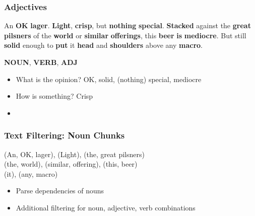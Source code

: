 \begin{frame}
    \frametitle{\textcolor{isegreen}{Adjectives}}
    \label{review_adjectives}
\begin{spacing}{1.6}
    An \textbf{\textcolor{isegreen}{OK}} \textbf{\textcolor{isered}{lager}}. \textbf{\textcolor{isered}{Light}}, \textbf{\textcolor{isegreen}{crisp}}, but \textbf{\textcolor{isered}{nothing}} \textbf{\textcolor{isegreen}{special}}. \textbf{\textcolor{iseblue}{Stacked}} against the \textbf{\textcolor{isegreen}{great}} \textbf{\textcolor{isered}{pilsners}} of the \textbf{\textcolor{isered}{world}} or \textbf{\textcolor{isegreen}{similar}} \textbf{\textcolor{isered}{offerings}}, this \textbf{\textcolor{isered}{beer}} \textbf{\textcolor{iseblue}{is}} \textbf{\textcolor{isegreen}{mediocre}}. But still \textbf{\textcolor{isegreen}{solid}} enough to \textbf{\textcolor{iseblue}{put}} it \textbf{\textcolor{isered}{head}} and \textbf{\textcolor{isered}{shoulders}} above any \textbf{\textcolor{isered}{macro}}.
\end{spacing}

\vspace{-10pt}
\begin{flushright}
    \textbf{\textcolor{isered}{NOUN}}, \textbf{\textcolor{iseblue}{VERB}}, \textbf{\textcolor{isegreen}{ADJ}}
\end{flushright}

\begin{itemize}
\item What is the opinion? OK, solid, (nothing) special, mediocre
\item How is something? Crisp
\item \hyperlink{stats_adjectives}{}
\end{itemize}
\end{frame}

\begin{frame}
    \frametitle{Text Filtering: Noun Chunks}
\begin{spacing}{1.6}
    (An, OK, lager), (Light), (the, great pilsners) \\
    (the, world), (similar, offering), (this, beer) \\
    (it), (any, macro)
\end{spacing}
\vspace{10pt}
\begin{itemize}
\item Parse dependencies of nouns
\item Additional filtering for noun, adjective, verb combinations
\end{itemize}
\end{frame}

